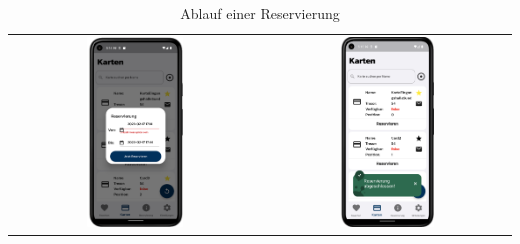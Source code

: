 \begin{table}[htbp]
  \centering
  \begin{tabular}{cc}
    \includegraphics[width=0.4\textwidth]{FLUTTER/images/GP/Client_Reservation.png} &
    \includegraphics[width=0.4\textwidth]{FLUTTER/images/GP/Client_Reservation_Success.png} \\
  \end{tabular}
  \caption{Ablauf einer Reservierung}
  \label{tab:example}
\end{table}

\newpage
